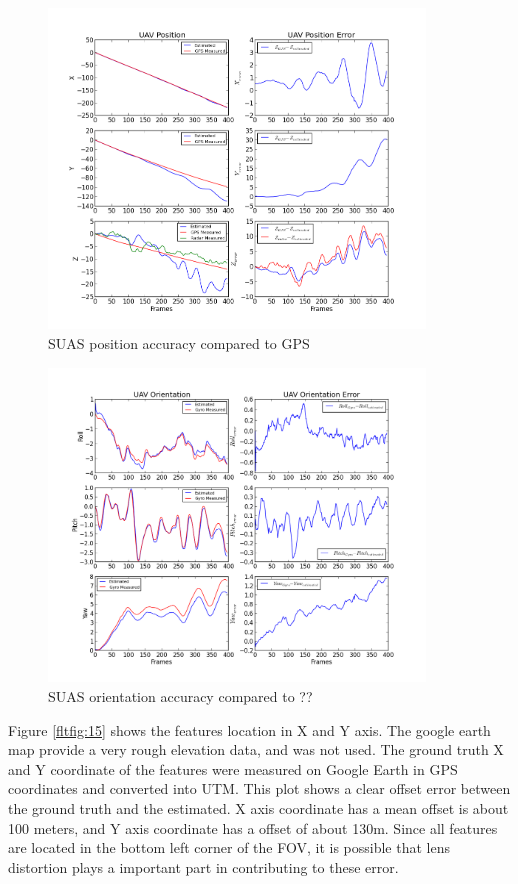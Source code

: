 \begin{figure}[h]
\centering
\includegraphics[width=10cm, keepaspectratio=true]
{./Figures/fltfig/airport/UAV_position_and_error.png}
\caption{SUAS position accuracy compared to GPS}
\label{fltfig:13}
\end{figure}

\begin{figure}[h]
\centering
\includegraphics[width=10cm, keepaspectratio=true]
{./Figures/fltfig/airport/UAV_orientation_and_error.png}
\caption{SUAS orientation accuracy compared to ??}
\label{fltfig:14}
\end{figure}
\FloatBarrier

Figure \ref{fltfig:15} shows the features location in X and Y axis.
The google earth map provide a very rough elevation data, and was not
used. The ground truth X and Y coordinate of the features were
measured on Google Earth in GPS coordinates and converted into UTM.
This plot shows a clear offset error between the ground truth and the
estimated. X axis coordinate has a mean offset is about 100 meters,
and Y axis coordinate has a offset of about 130m. Since all features
are located in the bottom left corner of the FOV, it is possible that
lens distortion plays a important part in contributing to these error. 


